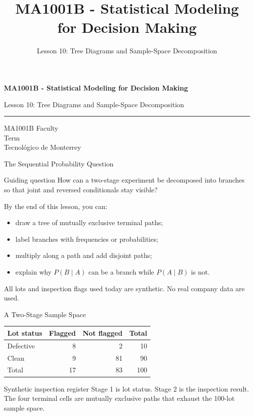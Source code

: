 \documentclass[aspectratio=169,10pt,english]{beamer}
\title{MA1001B - Statistical Modeling for Decision Making}
\subtitle{Lesson 10: Tree Diagrams and Sample-Space Decomposition}
\author{}
\institute{Tecnol\'ogico de Monterrey}
\date{}
\begin{document}
\begin{frame}[plain]
  \vspace{1.2cm}
  {\Large\bfseries MA1001B - Statistical Modeling for Decision Making\par}
  \vspace{0.7cm}
  {\large Lesson 10: Tree Diagrams and Sample-Space Decomposition\par}
  \vspace{0.7cm}
  {\color{TecRojo}\rule{\textwidth}{1.2pt}}
  \vspace{0.8cm}

  MA1001B Faculty\\[0.3cm]
  Term\\[0.3cm]
  Tecnol\'ogico de Monterrey
\end{frame}

\begin{frame}{The Sequential Probability Question}
  \begin{alertblock}{Guiding question}
    How can a two-stage experiment be decomposed into branches so that joint
    and reversed conditionals stay visible?
  \end{alertblock}

  \vspace{0.6em}
  By the end of this lesson, you can:
  \begin{itemize}
    \item draw a tree of mutually exclusive terminal paths;
    \item label branches with frequencies or probabilities;
    \item multiply along a path and add disjoint paths;
    \item explain why $P(B\mid A)$ can be a branch while $P(A\mid B)$ is not.
  \end{itemize}

  \vfill
  \scriptsize All lots and inspection flags used today are synthetic. No real company data are used.
\end{frame}

\begin{frame}{A Two-Stage Sample Space}
  \small
  \begin{center}
    \begin{tabular}{lrrr}
      \toprule
      \textbf{Lot status} & \textbf{Flagged} & \textbf{Not flagged} & \textbf{Total} \\
      \midrule
      Defective & 8 & 2 & 10 \\
      Clean & 9 & 81 & 90 \\
      \midrule
      Total & 17 & 83 & 100 \\
      \bottomrule
    \end{tabular}
  \end{center}

  \vspace{0.5em}
  \begin{exampleblock}{Synthetic inspection register}
    Stage 1 is lot status. Stage 2 is the inspection result. The four terminal
    cells are mutually exclusive paths that exhaust the 100-lot sample space.
  \end{exampleblock}
\end{frame}
\end{document}
